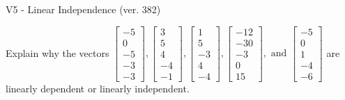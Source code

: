 \begin{exercise}
  \begin{exerciseTitle}V5 - Linear Independence (ver. 382)\end{exerciseTitle}
  \begin{exerciseStatement}
    Explain why the vectors \(\left[\begin{array}{r}
-5 \\
0 \\
-5 \\
-3 \\
-3
\end{array}\right] , \left[\begin{array}{r}
3 \\
5 \\
4 \\
-4 \\
-1
\end{array}\right] , \left[\begin{array}{r}
1 \\
5 \\
-3 \\
4 \\
-4
\end{array}\right] , \left[\begin{array}{r}
-12 \\
-30 \\
-3 \\
0 \\
15
\end{array}\right] , \text{ and } \left[\begin{array}{r}
-5 \\
0 \\
1 \\
-4 \\
-6
\end{array}\right]\) are linearly dependent or linearly independent.	



\end{exerciseStatement}
\end{exercise}
